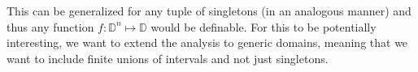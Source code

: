 \begin{exmp}
    This can be generalized for any tuple of singletons (in an analogous manner) and thus any function $f:\mathbb{D}^n\mapsto\mathbb{D}$ would be definable. For this to be potentially interesting, we want to extend the analysis to generic domains, meaning that we want to include finite unions of intervals and not just singletons.
\end{exmp} 

